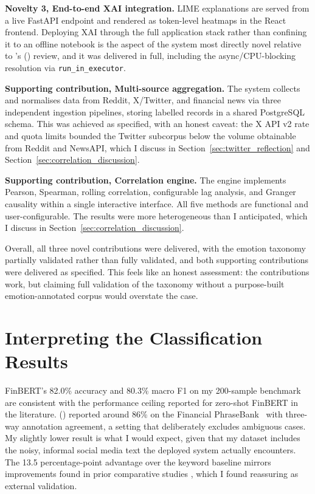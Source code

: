 \textbf{Novelty 3, End-to-end XAI integration.} LIME explanations are served from a live FastAPI endpoint and rendered as token-level heatmaps in the React frontend. Deploying XAI through the full application stack rather than confining it to an offline notebook is the aspect of the system most directly novel relative to \citeauthor{yeo2023xai}'s (\citeyear{yeo2023xai}) review, and it was delivered in full, including the async/CPU-blocking resolution via \texttt{run\_in\_executor}.

\textbf{Supporting contribution, Multi-source aggregation.} The system collects and normalises data from Reddit, X/Twitter, and financial news via three independent ingestion pipelines, storing labelled records in a shared PostgreSQL schema. This was achieved as specified, with an honest caveat: the X API v2 rate and quota limits bounded the Twitter subcorpus below the volume obtainable from Reddit and NewsAPI, which I discuss in Section~\ref{sec:twitter_reflection} and Section~\ref{sec:correlation_discussion}.

\textbf{Supporting contribution, Correlation engine.} The engine implements Pearson, Spearman, rolling correlation, configurable lag analysis, and Granger causality within a single interactive interface. All five methods are functional and user-configurable. The results were more heterogeneous than I anticipated, which I discuss in Section~\ref{sec:correlation_discussion}.

Overall, all three novel contributions were delivered, with the emotion taxonomy partially validated rather than fully validated, and both supporting contributions were delivered as specified. This feels like an honest assessment: the contributions work, but claiming full validation of the taxonomy without a purpose-built emotion-annotated corpus would overstate the case.

\section{Interpreting the Classification Results}

FinBERT's 82.0\% accuracy and 80.3\% macro F1 on my 200-sample benchmark are consistent with the performance ceiling reported for zero-shot FinBERT in the literature. \citeauthor{araci2019finbert} (\citeyear{araci2019finbert}) reported around 86\% on the Financial PhraseBank~\citep{malo2014financialphrasebank} with three-way annotation agreement, a setting that deliberately excludes ambiguous cases. My slightly lower result is what I would expect, given that my dataset includes the noisy, informal social media text the deployed system actually encounters. The 13.5 percentage-point advantage over the keyword baseline mirrors improvements found in prior comparative studies \citep{malo2014financialphrasebank}, which I found reassuring as external validation.

